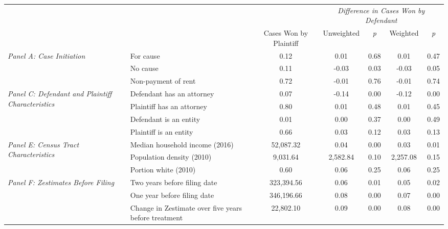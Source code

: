 \begin{tabular}{llccccc}
\toprule
 &  & \textit{} & \multicolumn{4}{c}{\textit{Difference in Cases Won by Defendant}} \\
 &  & Cases Won by Plaintiff & Unweighted & \emph{p} & Weighted & \emph{p} \\
\midrule
\multirow[c]{3}{3cm}{\textit{Panel A: Case Initiation}} & For cause & 0.12 & 0.01 & 0.68 & 0.01 & 0.47 \\
 & No cause & 0.11 & -0.03 & 0.03 & -0.03 & 0.05 \\
 & Non-payment of rent & 0.72 & -0.01 & 0.76 & -0.01 & 0.74 \\
\cline{1-7}
\multirow[c]{4}{3cm}{\textit{Panel C: Defendant and Plaintiff Characteristics}} & Defendant has an attorney & 0.07 & -0.14 & 0.00 & -0.12 & 0.00 \\
 & Plaintiff has an attorney & 0.80 & 0.01 & 0.48 & 0.01 & 0.45 \\
 & Defendant is an entity & 0.01 & 0.00 & 0.37 & 0.00 & 0.49 \\
 & Plaintiff is an entity & 0.66 & 0.03 & 0.12 & 0.03 & 0.13 \\
\cline{1-7}
\multirow[c]{3}{3cm}{\textit{Panel E: Census Tract Characteristics}} & Median household income (2016) & 52,087.32 & 0.04 & 0.00 & 0.03 & 0.01 \\
 & Population density (2010) & 9,031.64 & 2,582.84 & 0.10 & 2,257.08 & 0.15 \\
 & Portion white (2010) & 0.60 & 0.06 & 0.25 & 0.06 & 0.25 \\
\cline{1-7}
\multirow[c]{3}{3cm}{\textit{Panel F: Zestimates Before Filing}} & Two years before filing date & 323,394.56 & 0.06 & 0.01 & 0.05 & 0.02 \\
 & One year before filing date & 346,196.66 & 0.08 & 0.00 & 0.07 & 0.00 \\
 & Change in Zestimate over five years before treatment & 22,802.10 & 0.09 & 0.00 & 0.08 & 0.00 \\
\cline{1-7}
\bottomrule
\end{tabular}
